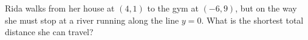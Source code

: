 Rida walks from her house at $(4,1)$ to the gym at $(-6,9)$, but on the way she must stop at a river running along the line $y=0$. What is the shortest total distance she can travel?
